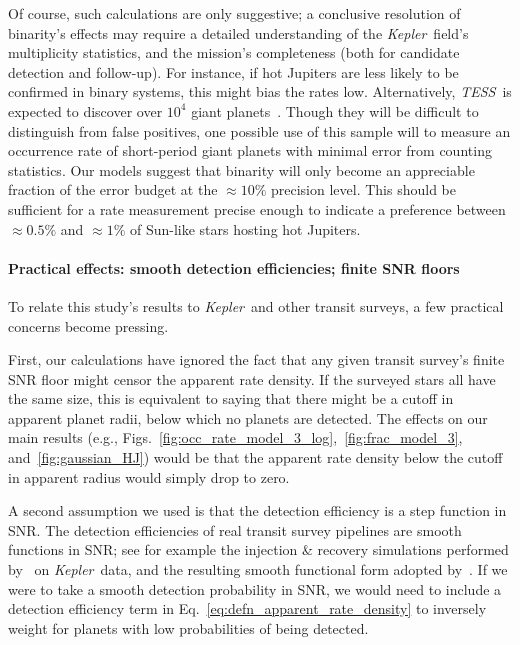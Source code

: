 \documentclass[12pt,modern]{aastex61}
\begin{document}
Of course, such calculations are only suggestive; a conclusive resolution 
of binarity's effects may require a detailed understanding of the 
{\it Kepler}\ field's multiplicity statistics, and the mission's completeness 
(both for candidate detection and follow-up).
For instance, if hot Jupiters are less likely to be confirmed in binary 
systems, this might bias the rates low.
Alternatively, {\it TESS}\ is expected to discover over $10^4$ 
giant planets~\citep{ricker_transiting_2014,sullivan_transiting_2015}.
Though they will be difficult to distinguish from false positives, one 
possible use of this sample will to measure an occurrence rate of 
short-period giant planets with minimal error from counting statistics.
Our models suggest that binarity will only become an appreciable fraction of 
the error budget at the $\approx 10\%$ precision level.
This should be sufficient for a rate measurement precise enough to indicate a 
preference between $\approx 0.5\%$ and $\approx 1\%$ of Sun-like stars hosting 
hot Jupiters.



\paragraph{Practical effects: smooth detection efficiencies; finite SNR floors}
To relate this study's results to {\it Kepler}\ and other transit surveys, a 
few practical concerns become pressing.

First, our calculations have ignored the fact that any given transit survey's 
finite SNR floor might censor the apparent rate density.
If the surveyed stars all have the same size, this is equivalent to 
saying that there might be a cutoff in apparent planet radii, below which no 
planets are detected.
The effects on our main results (e.g., 
Figs.~\ref{fig:occ_rate_model_3_log},~\ref{fig:frac_model_3}, 
and~\ref{fig:gaussian_HJ}) would be that the apparent rate density 
below the cutoff in apparent radius would simply drop to zero.

A second assumption we used is that the detection efficiency is a 
step function in SNR.
The detection efficiencies of real transit survey pipelines are smooth 
functions in SNR; see for example the injection \& recovery simulations 
performed by~\citet{christiansen_measuring_2016} on {\it Kepler}\ data, 
and the resulting smooth functional form adopted 
by~\citet{fulton_california-_2017}.
If we were to take a smooth detection probability in SNR, we would need to 
include a detection efficiency term in 
Eq.~\ref{eq:defn_apparent_rate_density} to inversely weight for planets 
with low probabilities of being detected.
\end{document}
